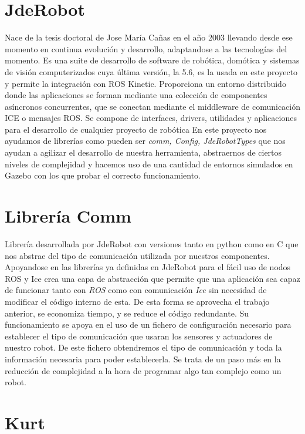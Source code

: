 \section{JdeRobot}
\label{sec:jderobot}

Nace de la tesis doctoral de Jose María Cañas en el año 2003 llevando desde ese momento en continua evolución y desarrollo, adaptandose a las tecnologías del momento.
Es una suite de desarrollo de software de robótica, domótica y sistemas de
visión computerizados cuya última versión, la 5.6, es la usada en este proyecto y permite la integración con ROS Kinetic. Proporciona un entorno distribuido donde las aplicaciones se forman mediante una colección de componentes asíncronos concurrentes, que se conectan mediante el middleware de comunicación ICE o mensajes ROS.
Se compone de interfaces, drivers, utilidades y aplicaciones para el desarrollo de cualquier proyecto de robótica
En este proyecto nos ayudamos de librerías como pueden ser \textit{comm, Config, JdeRobotTypes} que nos ayudan a agilizar el desarrollo de nuestra herramienta, abstraernos de ciertos niveles de complejidad y hacemos uso de una cantidad de entornos simulados en Gazebo con los que probar el correcto funcionamiento.


\section{Librería Comm}
\label{sec:libreria-com}

Librería desarrollada por JdeRobot con versiones tanto en python como en C que nos abstrae del tipo de comunicación utilizada por nuestros componentes.
Apoyandose en las librerías ya definidas en JdeRobot para el fácil uso de nodos ROS y Ice crea una capa de abstracción que permite que una aplicación sea capaz de funcionar tanto con \textit{ROS} como con comunicación \textit{Ice} sin necesidad de modificar el código interno de esta. De esta forma se aprovecha el trabajo anterior, se economiza tiempo, y se reduce el código redundante.
Su funcionamiento se apoya en el uso de un fichero de configuración necesario para establecer el tipo de comunicación que usaran los sensores y actuadores de nuestro robot. De este fichero obtendremos el tipo de comunicación y toda la información necesaria para poder establecerla. 
Se trata de un paso más en la reducción de complejidad a la hora de programar algo tan complejo como un robot.


\section{Kurt}
\label{sec:kurt}

